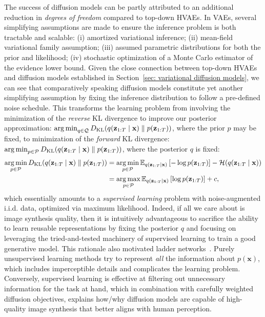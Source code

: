 The success of diffusion models can be partly attributed to an additional reduction in \textit{degrees of freedom} compared to top-down HVAEs. In VAEs, several simplifying assumptions are made to ensure the inference problem is both tractable and scalable: (i) amortized variational inference; (ii) mean-field variational family assumption; (iii) assumed parametric distributions for both the prior and likelihood; (iv) stochastic optimization of a Monte Carlo estimator of the evidence lower bound. Given the close connection between top-down HVAEs and diffusion models established in Section~\ref{sec: variational diffusion models}, we can see that comparatively speaking diffusion models constitute yet another simplifying assumption by fixing the inference distribution to follow a pre-defined noise schedule. This transforms the learning problem from involving the minimization of the \textit{reverse} KL divergence to improve our posterior approximation: $\operatorname*{arg\,min}_{q \in \mathcal{Q}}D_{\mathrm{KL}}( q(\mathbf{z}_{1:T} \mid \mathbf{x}) \parallel p(\mathbf{z}_{1:T}))$, where the prior $p$ may be fixed, to minimization of the \textit{forward} KL divergence: $\operatorname*{arg\,min}_{p \in \mathcal{P}} D_{\mathrm{KL}}( q(\mathbf{z}_{1:T} \mid \mathbf{x}) \parallel p(\mathbf{z}_{1:T}))$, where the posterior $q$ is fixed:
%
\begin{align}
    \operatorname*{arg\,min}_{p \in \mathcal{P}} D_{\mathrm{KL}}( q(\mathbf{z}_{1:T} \mid \mathbf{x}) \parallel p(\mathbf{z}_{1:T}))
    & = \operatorname*{arg\,min}_{p \in \mathcal{P}} \mathbb{E}_{q(\mathbf{z}_{1:T} \mid \mathbf{x})} \left[-\log p(\mathbf{z}_{1:T}) \right] - \mathcal{H}(q(\mathbf{z}_{1:T} \mid \mathbf{x}))
    \\[0pt] & = \operatorname*{arg\,max}_{p \in \mathcal{P}} \mathbb{E}_{q(\mathbf{z}_{1:T} \mid \mathbf{x})} \left[\log p(\mathbf{z}_{1:T}) \right] + c, \label{eq: erm}
\end{align}
which essentially amounts to a \textit{supervised learning} problem with noise-augmented i.i.d. data, optimized via maximum likelihood. Indeed, if all we care about is image synthesis quality, then it is intuitively advantageous to sacrifice the ability to learn reusable representations by fixing the posterior $q$ and focusing on leveraging the tried-and-tested machinery of supervised learning to train a good generative model. This rationale also motivated ladder networks~\citep{valpola2015neural}. Purely unsupervised learning methods try to represent \textit{all} the information about $p(\mathbf{x})$, which includes imperceptible details and complicates the learning problem. Conversely, supervised learning is effective at filtering out unnecessary information for the task at hand, which in combination with carefully weighted diffusion objectives, explains how/why diffusion models are capable of high-quality image synthesis that better aligns with human perception.

